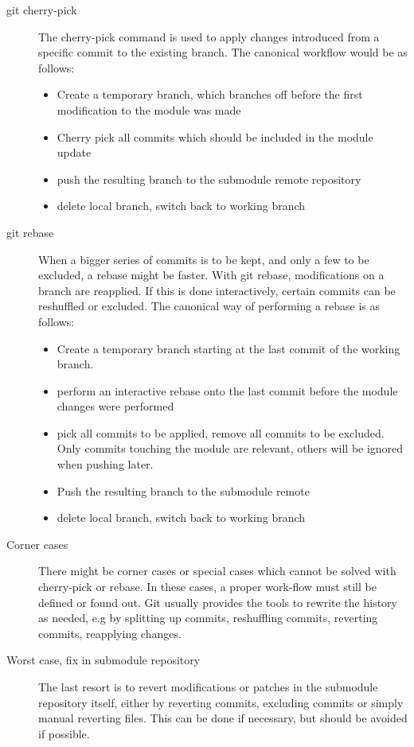 \documentclass{scrartcl}
\begin{document}
\begin{description}
\item [git cherry-pick] The cherry-pick command is used to apply
  changes introduced from a specific commit to the existing
  branch. The canonical workflow would be as follows:
  \begin{itemize}
  \item Create a temporary branch, which branches off before the first
    modification to the module was made
  \item Cherry pick all commits which should be included in the module
    update
  \item push the resulting branch to the submodule remote repository
  \item delete local branch, switch back to working branch
  \end{itemize}
\item [git rebase] When a bigger series of commits is to be kept, and
  only a few to be excluded, a rebase might be faster. With git
  rebase, modifications on a branch are reapplied. If this is done
  interactively, certain commits can be reshuffled or excluded. The
  canonical way of performing a rebase is as follows:
  \begin{itemize}
  \item Create a temporary branch starting at the last commit of the
    working branch.
  \item perform an interactive rebase onto the last commit before the
    module changes were performed
  \item pick all commits to be applied, remove all commits to be
    excluded. Only commits touching the module are relevant, others
    will be ignored when pushing later.
  \item Push the resulting branch to the submodule remote
  \item delete local branch, switch back to working branch
  \end{itemize}
\item [Corner cases] There might be corner cases or special cases
  which cannot be solved with cherry-pick or rebase. In these cases, a
  proper work-flow must still be defined or found out. Git usually
  provides the tools to rewrite the history as needed, e.g by
  splitting up commits, reshuffling commits, reverting commits,
  reapplying changes.
\item [Worst case, fix in submodule repository] The last resort is to
  revert modifications or patches in the submodule repository itself,
  either by reverting commits, excluding commits or simply manual
  reverting files. This can be done if necessary, but should be
  avoided if possible.
\end{description}
\end{document}
